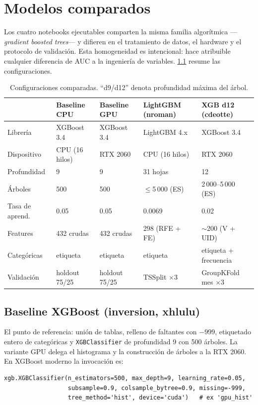 \chapter{Modelos comparados}
\label{cap:modelos}

Los cuatro notebooks ejecutables comparten la misma familia algorítmica ---\emph{gradient
boosted trees}--- y difieren en el tratamiento de datos, el hardware y el protocolo de
validación. Esta homogeneidad es intencional: hace atribuible cualquier diferencia de AUC a la
ingeniería de variables. \cref{tab:modelos} resume las configuraciones.

\begin{table}[ht]
  \centering
  \caption{Configuraciones comparadas. ``d9/d12'' denota profundidad máxima del árbol.}
  \label{tab:modelos}
  \small
  \begin{tabular}{lllll}
    \toprule
    & Baseline CPU & Baseline GPU & LightGBM (nroman) & XGB d12 (cdeotte) \\
    \midrule
    Librería        & XGBoost 3.4  & XGBoost 3.4  & LightGBM 4.x & XGBoost 3.4 \\
    Dispositivo     & CPU (16 hilos) & RTX 2060    & CPU (16 hilos) & RTX 2060 \\
    Profundidad     & 9            & 9            & 31 hojas     & 12 \\
    Árboles         & 500          & 500          & $\le$5\,000 (ES) & 2\,000--5\,000 (ES) \\
    Tasa de aprend. & 0.05         & 0.05         & 0.0069       & 0.02 \\
    Features        & 432 crudas   & 432 crudas   & 298 (RFE + FE) & $\sim$200 (V + UID) \\
    Categóricas     & etiqueta     & etiqueta     & etiqueta     & etiqueta + frecuencia \\
    Validación      & holdout 75/25 & holdout 75/25 & TSSplit $\times$3 & GroupKFold mes $\times$3 \\
    \bottomrule
  \end{tabular}
\end{table}

\section{Baseline XGBoost (inversion, xhlulu)}

El punto de referencia: unión de tablas, relleno de faltantes con $-999$, etiquetado entero de
categóricas y \texttt{XGBClassifier} de profundidad 9 con 500 árboles. La variante GPU delega el
histograma y la construcción de árboles a la RTX 2060. En XGBoost moderno la invocación es:
\begin{lstlisting}
xgb.XGBClassifier(n_estimators=500, max_depth=9, learning_rate=0.05,
                  subsample=0.9, colsample_bytree=0.9, missing=-999,
                  tree_method='hist', device='cuda')   # ex 'gpu_hist'
\end{lstlisting}


